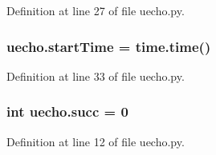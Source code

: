 Definition at line 27 of file uecho.\+py.

\subsubsection[{\texorpdfstring{start\+Time}{startTime}}]{\setlength{\rightskip}{0pt plus 5cm}uecho.\+start\+Time = time.\+time()}\hypertarget{namespaceuecho_a871cfa884511be1b39276bbe529f33bc}{}\label{namespaceuecho_a871cfa884511be1b39276bbe529f33bc}


Definition at line 33 of file uecho.\+py.

\subsubsection[{\texorpdfstring{succ}{succ}}]{\setlength{\rightskip}{0pt plus 5cm}int uecho.\+succ = 0}\hypertarget{namespaceuecho_aaf020131eccfb2e9f2e033da527da698}{}\label{namespaceuecho_aaf020131eccfb2e9f2e033da527da698}


Definition at line 12 of file uecho.\+py.

